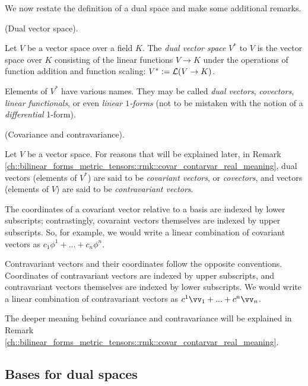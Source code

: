 We now restate the definition of a dual space and make some additional remarks.

\begin{defn}
\label{ch::motivated_intro::defn::dual_space_2}
    (Dual vector space).
    
    Let $V$ be a vector space over a field $K$. The \textit{dual vector space} $V^*$ to $V$ is the vector space over $K$ consisting of the linear functions $V \rightarrow K$ under the operations of function addition and function scaling: $V^* := \mathcal{L}(V \rightarrow K)$.

    Elements of $V^*$ have various names. They may be called \textit{dual vectors}, \textit{covectors}, \textit{linear functionals}, or even \textit{linear $1$-forms} (not to be mistaken with the notion of a \textit{differential} 1-form).
\end{defn}

\begin{defn}
\label{ch::motivated_intro::defn::covariance_contravariance}
    (Covariance and contravariance).
    
    Let $V$ be a vector space. For reasons that will be explained later, in Remark \ref{ch::bilinear_forms_metric_tensors::rmk::covar_contarvar_real_meaning}, dual vectors (elements of $V^*$) are said to be \textit{covariant vectors}, or \textit{covectors}, and vectors (elements of $V$) are said to be \textit{contravariant vectors}.
    
    The coordinates of a covariant vector relative to a basis are indexed by lower subscripts; contrastingly, covaraint vectors themselves are indexed by upper subscripts. So, for example, we would write a linear combination of covariant vectors as $c_1 \phi^1 + ... + c_n \phi^n$.
    
    Contravariant vectors and their coordinates follow the opposite conventions. Coordinates of contravariant vectors are indexed by upper subscripts, and contravariant vectors themselves are indexed by lower subscripts. We would write a linear combination of contravariant vectors as $c^1 \vv_1 + ... + c^n \vv_n$.
    
    The deeper meaning behind covariance and contravariance will be explained in Remark \ref{ch::bilinear_forms_metric_tensors::rmk::covar_contarvar_real_meaning}.
\end{defn}

\subsection*{Bases for dual spaces}

